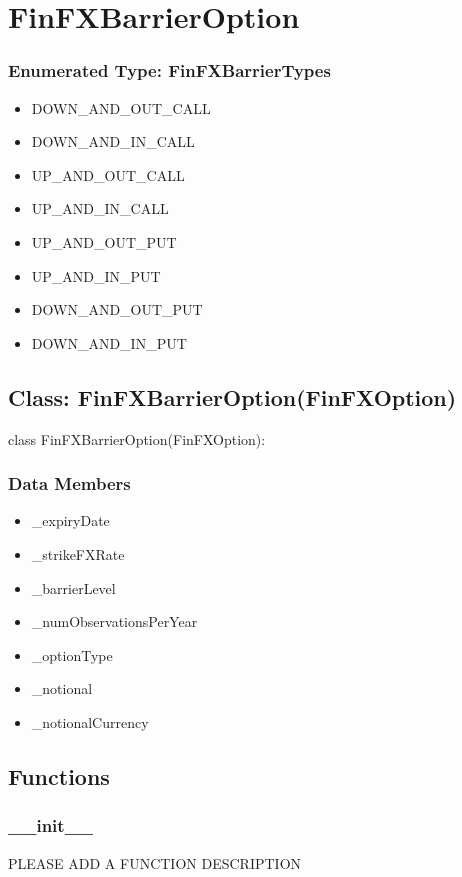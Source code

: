 \documentclass[twoside,11pt]{book}
\begin{document}
\newpage
\section{FinFXBarrierOption}

\subsubsection{Enumerated Type: FinFXBarrierTypes}
\begin{itemize}
\item{DOWN\_AND\_OUT\_CALL}
\item{DOWN\_AND\_IN\_CALL}
\item{UP\_AND\_OUT\_CALL}
\item{UP\_AND\_IN\_CALL}
\item{UP\_AND\_OUT\_PUT}
\item{UP\_AND\_IN\_PUT}
\item{DOWN\_AND\_OUT\_PUT}
\item{DOWN\_AND\_IN\_PUT}
\end{itemize}

\subsection*{Class: FinFXBarrierOption(FinFXOption)}
class FinFXBarrierOption(FinFXOption): 

\subsubsection*{Data Members}
\begin{itemize}
\item{\_expiryDate}
\item{\_strikeFXRate}
\item{\_barrierLevel}
\item{\_numObservationsPerYear}
\item{\_optionType}
\item{\_notional}
\item{\_notionalCurrency}
\end{itemize}

\subsection*{Functions}

\subsubsection*{{\bf \_\_init\_\_}}
PLEASE ADD A FUNCTION DESCRIPTION
\end{document}
